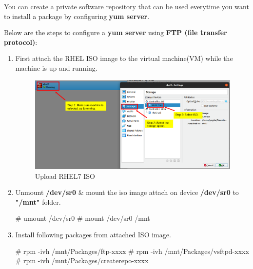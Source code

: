 \setlength{\columnsep}{3pt}
\begin{flushleft}
	\bigskip
	You can create a private software repository that can be used everytime you want to install a package by configuring \textbf{yum server}.
	
	Below are the steps to configure a \textbf{yum server} using \textbf{FTP (file transfer protocol)}:
	
	\begin{enumerate}
		\item First attach the RHEL ISO image to the virtual machine(VM) while the machine is up and running.
		
		\begin{figure}[h!]
			\centering
			\includegraphics[scale=.3]{content/chapter11/images/ISO.png}
			\caption{Upload RHEL7 ISO}
			\label{fig:iso}
		\end{figure}	
		
		\item Unmount \textbf{/dev/sr0} \& mount the iso image attach on device \textbf{/dev/sr0} to \textbf{"/mnt"} folder.
		\begin{tcolorbox}[breakable,notitle,boxrule=-0pt,colback=black,colframe=black]
			\color{green}
			\font=9pt
			\# umount	/dev/sr0
			\newline
			\# mount	/dev/sr0	/mnt
			\font=4pt
		\end{tcolorbox}

		\bigskip
		\item Install following packages from attached ISO image.
		\begin{tcolorbox}[breakable,notitle,boxrule=-0pt,colback=black,colframe=black]
			\color{green}
			\font=9pt
			\# rpm	-ivh	/mnt/Packages/ftp-xxxx
			\newline
			\# rpm	-ivh 	/mnt/Packages/vsftpd-xxxx
			\newline
			\# rpm	-ivh	/mnt/Packages/createrepo-xxxx
			\font=4pt
		\end{tcolorbox}
		

\end{enumerate}
\end{flushleft}
